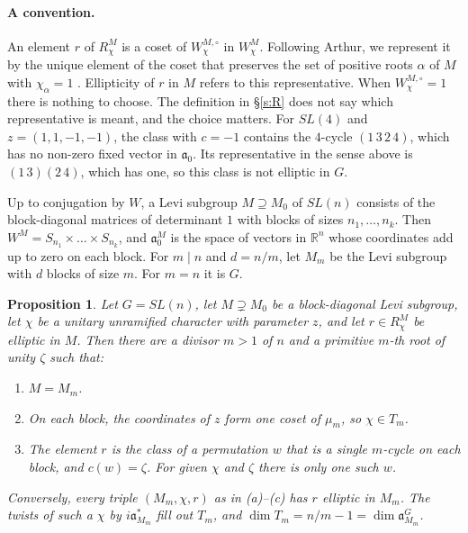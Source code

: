 \documentclass[12pt,letterpaper]{article}
\numberwithin{equation}{section}
\theoremstyle{plain}
\newtheorem{proposition}[theorem]{Proposition}
\theoremstyle{definition}
\theoremstyle{remark}
\newcommand{\fa}{\mathfrak{a}}
\begin{document}
\paragraph{A convention.} An element $r$ of $R^M_\chi$ is a coset of $W^{M,\circ}_\chi$ in $W^M_\chi$. Following Arthur, we represent it by the unique element of the coset that preserves the set of positive roots $\alpha$ of $M$ with $\chi_\alpha=1$ \cite[\S12, Remark~3]{Ar91}. Ellipticity of $r$ in $M$ refers to this representative. When $W^{M,\circ}_\chi=1$ there is nothing to choose. The definition in \S\ref{s:R} does not say which representative is meant, and the choice matters. For $SL(4)$ and $z=(1,1,-1,-1)$, the class with $c=-1$ contains the $4$-cycle $(1\,3\,2\,4)$, which has no non-zero fixed vector in $\fa_0$. Its representative in the sense above is $(1\,3)(2\,4)$, which has one, so this class is not elliptic in $G$.

Up to conjugation by $W$, a Levi subgroup $M\supseteq M_0$ of $SL(n)$ consists of the block-diagonal matrices of determinant $1$ with blocks of sizes $n_1,\dots,n_k$. Then $W^M=S_{n_1}\times\dots\times S_{n_k}$, and $\fa_0^M$ is the space of vectors in $\mathbb{R}^n$ whose coordinates add up to zero on each block. For $m\mid n$ and $d=n/m$, let $M_m$ be the Levi subgroup with $d$ blocks of size $m$. For $m=n$ it is $G$.

\begin{proposition}\label{p:slnell}
Let $G=SL(n)$, let $M\supsetneq M_0$ be a block-diagonal Levi subgroup, let $\chi$ be a unitary unramified character with parameter $z$, and let $r\in R^M_\chi$ be elliptic in $M$. Then there are a divisor $m>1$ of $n$ and a primitive $m$-th root of unity $\zeta$ such that:
\begin{enumerate}[label=(\alph*)]
\item $M=M_m$.
\item On each block, the coordinates of $z$ form one coset of $\mu_m$, so $\chi\in T_m$.
\item The element $r$ is the class of a permutation $w$ that is a single $m$-cycle on each block, and $c(w)=\zeta$. For given $\chi$ and $\zeta$ there is only one such $w$.
\end{enumerate}
Conversely, every triple $(M_m,\chi,r)$ as in (a)--(c) has $r$ elliptic in $M_m$. The twists of such a $\chi$ by $i\fa_{M_m}^*$ fill out $T_m$, and $\dim T_m=n/m-1=\dim\fa_{M_m}^G$.
\end{proposition}
\end{document}
